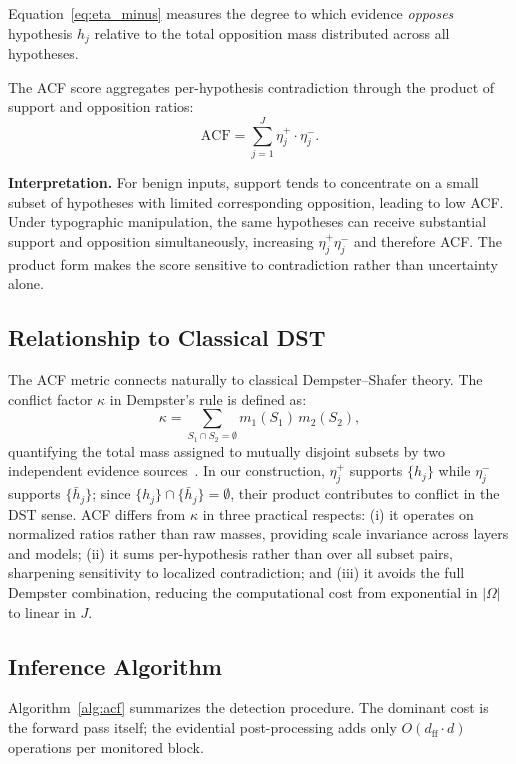 \documentclass[preprint,12pt]{elsarticle}
\begin{document}
Equation~\eqref{eq:eta_minus} measures the degree to which evidence \emph{opposes} hypothesis $h_j$ relative to the total opposition mass distributed across all hypotheses.

The ACF score aggregates per-hypothesis contradiction through the product of support and opposition ratios:
\begin{equation}
\boxed{\text{ACF} = \sum_{j=1}^{J} \eta^+_j \cdot \eta^-_j.}
\label{eq:acf_final}
\end{equation}

\textbf{Interpretation.} For benign inputs, support tends to concentrate on a small subset of hypotheses with limited corresponding opposition, leading to low ACF. Under typographic manipulation, the same hypotheses can receive substantial support and opposition simultaneously, increasing $\eta^+_j \eta^-_j$ and therefore ACF. The product form makes the score sensitive to contradiction rather than uncertainty alone.

\subsection{Relationship to Classical DST}

The ACF metric connects naturally to classical Dempster--Shafer theory. The conflict factor $\kappa$ in Dempster's rule is defined as:
\begin{equation}
\kappa = \sum_{S_1 \cap S_2 = \emptyset} m_1(S_1) \, m_2(S_2),
\end{equation}
quantifying the total mass assigned to mutually disjoint subsets by two independent evidence sources~\cite{dempster1967upper}. In our construction, $\eta^+_j$ supports $\{h_j\}$ while $\eta^-_j$ supports $\{\bar{h}_j\}$; since $\{h_j\} \cap \{\bar{h}_j\} = \emptyset$, their product contributes to conflict in the DST sense. ACF differs from $\kappa$ in three practical respects: (i) it operates on normalized ratios rather than raw masses, providing scale invariance across layers and models; (ii) it sums per-hypothesis rather than over all subset pairs, sharpening sensitivity to localized contradiction; and (iii) it avoids the full Dempster combination, reducing the computational cost from exponential in $|\Omega|$ to linear in $J$.

\subsection{Inference Algorithm}

Algorithm~\ref{alg:acf} summarizes the detection procedure. The dominant cost is the forward pass itself; the evidential post-processing adds only $O(d_{\text{ff}} \cdot d)$ operations per monitored block.
\end{document}
